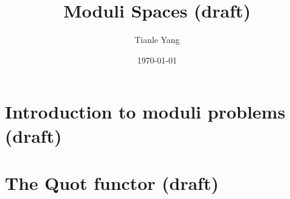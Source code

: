 \documentclass[sectionlevel=chapter]{noteformyself}
\title{Moduli Spaces (draft)}
\author{Tianle Yang}
\date{\today}
\begin{document}
    \maketitle

    \tableofcontents

    \section{Introduction to moduli problems (draft)}
    
    \section{The Quot functor (draft)}
    

    
\end{document}
